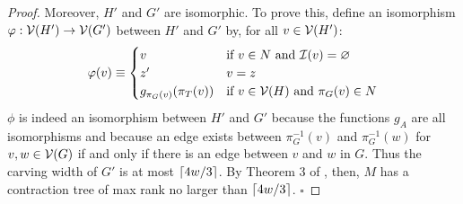 \begin{proof}
Moreover, $H'$ and $G'$ are isomorphic. To prove this, define an isomorphism $\varphi: \mathcal{V}(H') \rightarrow \mathcal{V}(G')$ between $H'$ and $G'$ by, for all $v \in \mathcal{V}(H')$:
$$\varphi(v) \equiv \begin{cases}v&\text{if}~v \in N~\text{and}~\mathcal{I}(v)=\varnothing\\z'&v=z\\g_{\pi_G(v)}(\pi_T(v))&\text{if}~v \in \mathcal{V}(H)~\text{and}~\pi_G(v) \in N\end{cases}$$
$\phi$ is indeed an isomorphism between $H'$ and $G'$ because the functions $g_A$ are all isomorphisms and because an edge exists between $\pi_G^{-1}(v)$ and $\pi_G^{-1}(w)$ for $v, w \in \mathcal{V}(G)$ if and only if there is an edge between $v$ and $w$ in $G$. Thus the carving width of $G'$ is at most $\lceil4w/3\rceil$. By Theorem 3 of \cite{DDV19}, then, $M$ has a contraction tree of max rank no larger than $\lceil4w/3\rceil$.
\hfill$\square$
\end{proof}